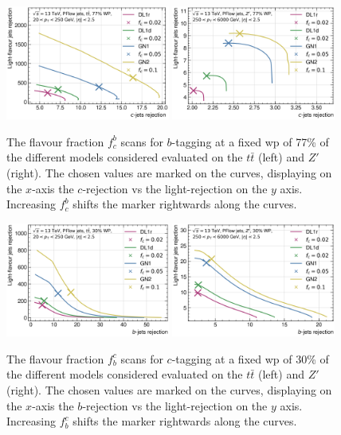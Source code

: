 \begin{figure}[h!]
  \centering
  \includegraphics[width=0.48\textwidth]{Images/FTAG/GN/GN2/fraction_scans/FractionScanPlot_tt.png}
  \includegraphics[width=0.48\textwidth]{Images/FTAG/GN/GN2/fraction_scans/FractionScanPlot_zp.png}
  \caption{The flavour fraction $f^b_c$ scans for $b$-tagging at a fixed \gls{wp} of 77\% of the different models considered evaluated on the $t\bar{t}$ (left) and $Z'$ (right). The chosen values are marked on the curves, displaying on the $x$-axis the $c$-rejection vs the light-rejection on the $y$ axis. Increasing $f^b_c$ shifts the marker rightwards along the curves. }
  \label{fig:GNxscansfc}
\end{figure}

\begin{figure}[h!]
  \centering
  \includegraphics[width=0.48\textwidth]{Images/FTAG/GN/GN2/fraction_scans/FractionScanPlot_tt_c.png}
  \includegraphics[width=0.48\textwidth]{Images/FTAG/GN/GN2/fraction_scans/FractionScanPlot_zp_c.png}
  \caption{The flavour fraction $f^c_b$ scans for $c$-tagging at a fixed \gls{wp} of 30\% of the different models considered evaluated on the $t\bar{t}$ (left) and $Z'$ (right). The chosen values are marked on the curves, displaying on the $x$-axis the $b$-rejection vs the light-rejection on the $y$ axis. Increasing $f^c_b$ shifts the marker rightwards along the curves. }
  \label{fig:GNxscansfb}
\end{figure} 

